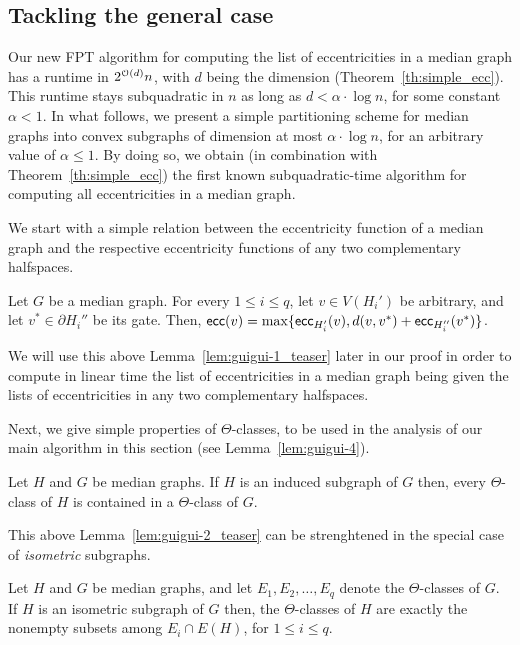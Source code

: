 \documentclass[a4paper,UKenglish,numberwithinsect,cleveref, autoref]{lipics-v2021}
\newcommand{\ecc}{\mbox{\textsf{ecc}}}
\begin{document}
\subsection{Tackling the general case} \label{subsec:reduction}

Our new FPT algorithm for computing the list of eccentricities in a median graph has a runtime in $2^{{\cal O}(d)}n$, with $d$ being the dimension (Theorem~\ref{th:simple_ecc}). 
This runtime stays subquadratic in $n$ as long as $d < \alpha \cdot \log{n}$, for some constant $\alpha < 1$.
In what follows, we present a simple partitioning scheme for median graphs into convex subgraphs of dimension at most $\alpha \cdot \log{n}$, for an arbitrary value of $\alpha \leq 1$.
By doing so, we obtain (in combination with Theorem~\ref{th:simple_ecc}) the first known subquadratic-time algorithm for computing all eccentricities in a median graph.

We start with a simple relation between the eccentricity function of a median graph and the respective eccentricity functions of any two complementary halfspaces.

\begin{lemma}[\ref{lem:guigui-1}]\label{lem:guigui-1_teaser}
Let $G$ be a median graph.
For every $1 \leq i \leq q$, let $v \in V(H_i')$ be arbitrary, and let $v^* \in \partial H_i''$ be its gate.
Then, $\ecc(v) = \max\{\ecc_{H_i'}(v), d(v,v^*) + \ecc_{H_i''}(v^*)\}$.
\end{lemma}

We will use this above Lemma~\ref{lem:guigui-1_teaser} later in our proof in order to compute in linear time the list of eccentricities in a median graph being given the lists of eccentricities in any two complementary halfspaces.

Next, we give simple properties of $\Theta$-classes, to be used in the analysis of our main algorithm in this section (see Lemma~\ref{lem:guigui-4}).

\begin{lemma}[\ref{lem:guigui-2}]\label{lem:guigui-2_teaser}
Let $H$ and $G$ be median graphs.
If $H$ is an induced subgraph of $G$ then, every $\Theta$-class of $H$ is contained in a $\Theta$-class of $G$.
\end{lemma}

This above Lemma~\ref{lem:guigui-2_teaser} can be strenghtened in the special case of {\em isometric} subgraphs.

\begin{lemma}[\ref{lem:guigui-2bis}]\label{lem:guigui-2bis_teaser}
Let $H$ and $G$ be median graphs, and let $E_1,E_2,\ldots,E_q$ denote the $\Theta$-classes of $G$.
If $H$ is an isometric subgraph of $G$ then, the $\Theta$-classes of $H$ are exactly the nonempty subsets among $E_i \cap E(H)$, for $1 \leq i \leq q$.
\end{lemma}
\end{document}
